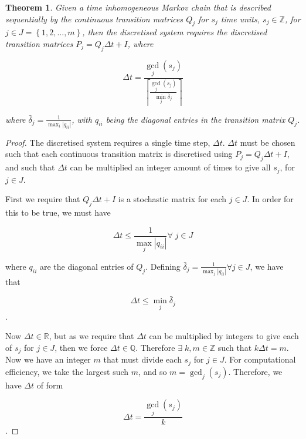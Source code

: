 \documentclass{article}
\newtheorem{theorem}{Theorem}
\begin{document}
\begin{theorem}\label{thrm:discretisetimeinhomogeneousmarkovchains}
Given a time inhomogeneous Markov chain that is described sequentially by the continuous transition matrices $Q_j$ for $s_j$ time units, $s_j \in \mathbb{Z}$, for $j \in J = \left\{ 1, 2, ..., m \right\}$, then the discretised system requires the discretised transition matrices $P_j = Q_j \Delta t + I$, where

$$
\Delta t = \frac{\gcd_j(s_j)}{\left\lceil \frac{\gcd_j(s_j)}{\min_j \bar{\delta}_j} \right\rceil}
$$

where $\bar{\delta}_j = \frac{1}{\max_i |q_{ii}|}$, with $q_{ii}$ being the diagonal entries in the transition matrix $Q_j$.
\end{theorem}

\begin{proof}
The discretised system requires a single time step, $\Delta t$.
$\Delta t$ must be chosen such that each continuous transition matrix is discretised using $P_j = Q_j \Delta t + I$, and such that $\Delta t$ can be multiplied an integer amount of times to give all $s_j$, for $j \in J$.

First we require that $Q_j \Delta t + I$ is a stochastic matrix for each $j \in J$. In order for this to be true, we must have

\begin{equation*}
\Delta t \leq \frac{1}{\max_j |q_{ii}|} \forall\; j \in J
\end{equation*}

where $q_{ii}$ are the diagonal entries of $Q_j$. Defining $\bar{\delta}_j = \frac{1}{\max_j |q_{ii}|} \forall j \in J$, we have that

\begin{equation}\label{eqn:cond1}
\Delta t \leq \min_j \bar{\delta}_j
\end{equation}.

Now $\Delta t \in \mathbb{R}$, but as we require that $\Delta t$ can be
multiplied by integers to give each of $s_j$ for $j \in J$, then we force
$\Delta t \in \mathbb{Q}$. Therefore $\exists\; k, m \in \mathbb{Z}$ such that $k \Delta t = m$.
Now we have an integer $m$ that must divide each $s_j$ for $j \in J$. For
computational efficiency, we take the largest such $m$, and so $m = \gcd_j (s_j)$. Therefore, we have $\Delta t$ of form

\begin{equation}\label{eqn:cond2}
\Delta t = \frac{\gcd_j(s_j)}{k}
\end{equation}.


\end{proof}
\end{document}
